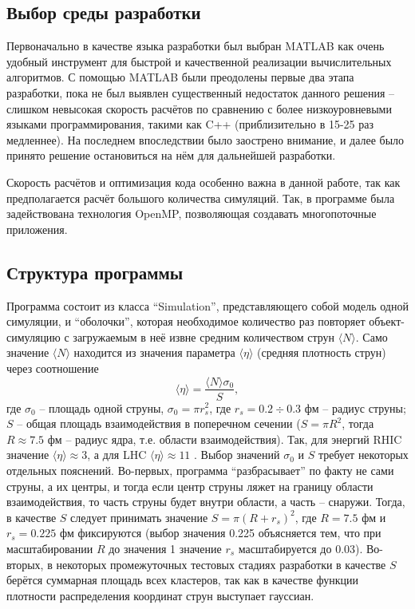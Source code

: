 \subsection{Выбор среды разработки}
Первоначально в качестве языка разработки был выбран MATLAB как очень удобный инструмент для быстрой и качественной реализации вычислительных алгоритмов. С помощью MATLAB были преодолены первые два этапа разработки, пока не был выявлен существенный недостаток данного решения -- слишком невысокая скорость расчётов по сравнению с более низкоуровневыми языками программирования, такими как C++ (приблизительно в 15-25 раз медленнее). На последнем впоследствии было заострено внимание, и далее было принято решение остановиться на нём для дальнейшей разработки. 

Скорость расчётов и оптимизация кода особенно важна в данной работе, так как предполагается расчёт большого количества симуляций. Так, в программе была задействована технология OpenMP, позволяющая создавать многопоточные приложения. 
\subsection{Структура программы}
Программа состоит из класса ``Simulation'', представляющего собой модель одной симуляции, и ``оболочки'', которая необходимое количество раз повторяет объект-симуляцию с загружаемым в неё извне средним количеством струн $\langle N \rangle$. Само значение $\langle N \rangle$ находится из значения параметра $\langle \eta \rangle$ (средняя плотность струн) через соотношение 
\begin{equation} \label{eq:eta}
	\langle \eta \rangle = \frac{\langle N \rangle \sigma_0}{S},
\end{equation}
где $\sigma_0$ -- площадь одной струны, $\sigma_0 = \pi r_s^2$, где $r_s = 0.2 \div 0.3$ фм -- радиус струны; $S$ -- общая площадь взаимодействия в поперечном сечении ($S = \pi R^2$, тогда $R \approx 7.5$ фм -- радиус ядра, т.е. области взаимодействия). Так, для энергий RHIC значение $\langle \eta \rangle \approx 3$, а для LHC $\langle \eta \rangle \approx 11$ \cite{RHICandLHC}. Выбор значений $\sigma_0$ и $S$ требует некоторых отдельных пояснений. Во-первых, программа ``разбрасывает'' по факту не сами струны, а их центры, и тогда если центр струны ляжет на границу области взаимодействия, то часть струны будет внутри области, а часть -- снаружи. Тогда, в качестве $S$ следует принимать значение $S = \pi (R + r_s)^2$, где $R = 7.5$ фм и $r_s = 0.225$ фм фиксируются (выбор значения 0.225 объясняется тем, что при масштабировании $R$ до значения 1 значение $r_s$ масштабируется до 0.03). Во-вторых, в некоторых промежуточных тестовых стадиях разработки в качестве $S$ берётся суммарная площадь всех кластеров, так как в качестве функции плотности распределения координат струн выступает гауссиан.

